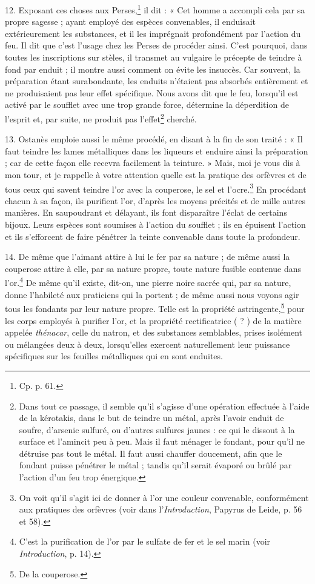 \documentclass[a4paper, 11pt, oneside, polutonikogreek, french]{article}
\begin{document}
12. Exposant ces choses aux Perses,\footnote{Cp. p. 61.} il dit : « Cet homme a accompli cela par sa propre sagesse ; ayant employé des espèces convenables, il enduisait extérieurement les substances, et il les imprégnait profondément par l'action du feu. Il dit que c'est l'usage chez les Perses de procéder ainsi. C'est pourquoi, dans toutes les inscriptions sur stèles, il transmet au vulgaire le précepte de teindre à fond par enduit ; il montre aussi comment on évite les insuccès. Car souvent, la préparation étant surabondante, les enduits n'étaient pas absorbés entièrement et ne produisaient pas leur effet spécifique. Nous avons dit que le feu, lorsqu'il est activé par le soufflet avec une trop grande force, détermine la déperdition de l'esprit et, par suite, ne produit pas l'effet\footnote{Dans tout ce passage, il semble qu'il s'agisse d'une opération effectuée à l'aide de la kérotakis, dans le but de teindre un métal, après l'avoir enduit de soufre, d'arsenic sulfuré, ou d'autres sulfures jaunes : ce qui le dissout à la surface et l'amincit peu à peu. Mais il faut ménager le fondant, pour qu'il ne détruise pas tout le métal. Il faut aussi chauffer doucement, afin que le fondant puisse pénétrer le métal ; tandis qu'il serait évaporé ou brûlé par l'action d'un feu trop énergique.} cherché.

13. Ostanès emploie aussi le même procédé, en disant à la fin de son traité : « Il faut teindre les lames métalliques dans les liqueurs et enduire ainsi la préparation ; car de cette façon elle recevra facilement la teinture. » Mais, moi je vous dis à mon tour, et je rappelle à votre attention quelle est la pratique des orfèvres et de tous ceux qui savent teindre l'or avec la couperose, le sel et l'ocre.\footnote{On voit qu'il s'agit ici de donner à l'or une couleur convenable, conformément aux pratiques des orfèvres (voir dans l'\emph{Introduction}, Papyrus de Leide, p. 56 et 58).} En procédant chacun à sa façon, ils purifient l'or, d'après les moyens précités et de mille autres manières. En saupoudrant et délayant, ils font disparaître l'éclat de certains bijoux. Leurs espèces sont soumises à l'action du soufflet ; ils en épuisent l'action et ils s'efforcent de faire pénétrer la teinte convenable dans toute la profondeur.

14. De même que l'aimant attire à lui le fer par sa nature ; de même aussi la couperose attire à elle, par sa nature propre, toute nature fusible contenue dans l'or.\footnote{C'est la purification de l'or par le sulfate de fer et le sel marin (voir \emph{Introduction}, p. 14).} De même qu'il existe, dit-on, une pierre noire sacrée qui, par sa nature, donne l'habileté aux praticiens qui la portent ; de même aussi nous voyons agir tous les fondants par leur nature propre. Telle est la propriété astringente,\footnote{De la couperose.} pour les corps employés à purifier l'or, et la propriété rectificatrice ( ? ) de la matière appelée \emph{thénacar}, celle du natron, et des substances semblables, prises isolément ou mélangées deux à deux, lorsqu'elles exercent naturellement leur puissance spécifiques sur les feuilles métalliques qui en sont enduites.
\end{document}
